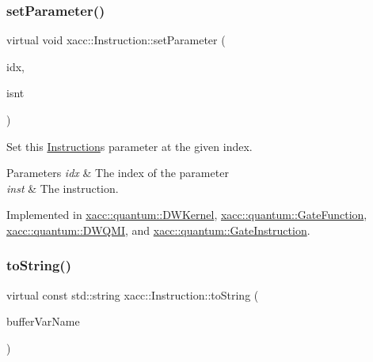 \mbox{\label{a01657_a407a0ac662fa0b1ec3e301e8ff9bade7}} 
\subsubsection{\texorpdfstring{set\+Parameter()}{setParameter()}}
{\footnotesize\ttfamily virtual void xacc\+::\+Instruction\+::set\+Parameter (\begin{DoxyParamCaption}\item[{const int}]{idx,  }\item[{Instruction\+Parameter \&}]{isnt }\end{DoxyParamCaption})\hspace{0.3cm}{\ttfamily [pure virtual]}}

Set this \hyperlink{a01657}{Instruction}\textquotesingle{}s parameter at the given index.


\begin{DoxyParams}{Parameters}
{\em idx} & The index of the parameter \\
\hline
{\em inst} & The instruction. \\
\hline
\end{DoxyParams}


Implemented in \hyperlink{a01221_adf89cdd1f54e183c4cff36b338b2be8d}{xacc\+::quantum\+::\+D\+W\+Kernel}, \hyperlink{a01249_ab8d9789b46e92e27a9d7c9c5b7e3683c}{xacc\+::quantum\+::\+Gate\+Function}, \hyperlink{a01225_a194b5b9f58262774fde0285f4c3f60af}{xacc\+::quantum\+::\+D\+W\+Q\+MI}, and \hyperlink{a01253_afb8f7582d7520c77d61b9016753f5669}{xacc\+::quantum\+::\+Gate\+Instruction}.

\mbox{\label{a01657_ae94c2d089908294c1d410b14c96817ae}} 
\subsubsection{\texorpdfstring{to\+String()}{toString()}}
{\footnotesize\ttfamily virtual const std\+::string xacc\+::\+Instruction\+::to\+String (\begin{DoxyParamCaption}\item[{const std\+::string \&}]{buffer\+Var\+Name }\end{DoxyParamCaption})\hspace{0.3cm}{\ttfamily [pure virtual]}}

